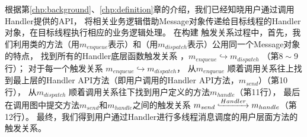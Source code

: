 








根据第\ref{chp:background}、\ref{chp:definition}章的介绍，我们已经知晓用户通过调用Handler提供的API，
将相关业务逻辑借助Message对象传递给目标线程的Handler对象，在目标线程执行相应的业务逻辑处理。
在构建 触发关系过程中，首先，我们利用类的方法（用$m_{enqueue}$表示）和（用$m_{dispatch}$表示）公用同一个Message对象的特点，
找到所有的Handler底层函数触发关系 ，$m_{enqueue}  \hookrightarrow  m_{dispatch}$ （第$8\sim$9 行）；
对于每一个触发关系 $m_{enqueue}  \hookrightarrow  m_{dispatch}$，
从$m_{enqueue}$ 顺着调用关系往上找到最上层的Handler API方法（即用户调用的Handler API方法，$m_{send}$）（第10行），
从$m_{dispatch}$ 顺着调用关系往下找到用户定义的方法$m_{handle}$（第11行），
最后在调用图中提交方法$m_{send}$和$m_{handle}$之间的触发关系 $m_{send} \lhook\joinrel\xrightarrow{Handler} m_{handle}$（第12行）。
最终，我们得到用户通过Handler进行多线程消息调度的用户层面方法的触发关系。


